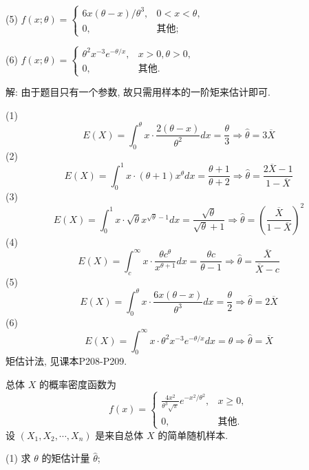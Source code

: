 \documentclass[standard]{ExBook}
\renewenvironment{shaded}{%
  \def\FrameCommand{\fboxsep=\FrameSep \colorbox{shadecolor}}%
  \MakeFramed{\advance\hsize-\width \FrameRestore}%
}{%
  \endMakeFramed
}
\begin{document}
\begin{qitems}
\begin{bbox}
\begin{shaded}
(5) \(f(x; \theta) = 
\begin{cases} 
6x(\theta - x)/\theta^3, & 0 < x < \theta, \\
0, & \text{其他};
\end{cases}\)

(6) \(f(x; \theta) = 
\begin{cases} 
\theta^2x^{-3}e^{-\theta/x}, & x > 0, \theta > 0, \\
0, & \text{其他}.
\end{cases}\)
    \end{shaded}
    \end{bbox}

\vspace{\dimexpr2.5cm-5em\relax}

解: 由于题目只有一个参数, 故只需用样本的一阶矩来估计即可.

(1)
$$
E(X) = \int_{0}^{\theta} x \cdot \frac{2(\theta - x)}{\theta^2} dx = \frac{\theta}{3}
\Longrightarrow
\hat{\theta} = 3\overline{X}
$$
(2)
$$
E(X) = \int_{0}^{1} x \cdot (\theta + 1)x^{\theta} dx = \frac{\theta + 1}{\theta + 2}
\Longrightarrow
\hat{\theta} = \frac{2\overline{X} - 1}{1 - \overline{X}}
$$
(3)
$$
E(X) = \int_{0}^{1} x \cdot \sqrt{\theta} x^{\sqrt{\theta} - 1} dx = \frac{\sqrt{\theta}}{\sqrt{\theta} + 1}
\Longrightarrow
\hat{\theta} = \left( \frac{\overline{X}}{1 - \overline{X}} \right)^2
$$
(4)
$$
E(X) = \int_{c}^{\infty} x \cdot \frac{\theta c^{\theta}}{x^{\theta + 1}} dx = \frac{\theta c}{\theta - 1}
\Longrightarrow
\hat{\theta} = \frac{\overline{X}}{\overline{X} - c}
$$
(5)
$$
E(X) = \int_{0}^{\theta} x \cdot \frac{6x(\theta - x)}{\theta^3} dx = \frac{\theta}{2}
\Longrightarrow
\hat{\theta} = 2\overline{X}
$$
(6)
$$
E(X) = \int_{0}^{\infty} x \cdot \theta^2 x^{-3} e^{-\theta/x} dx = \theta
\Longrightarrow
\hat{\theta} = \overline{X}
$$
\textcolor{themeColor}{\selectfont {} 矩估计法, 见课本P208-P209.}

\vspace{2.5cm-5em}

    \begin{bbox}
    \begin{shaded}
        \qitem
总体 \(X\) 的概率密度函数为
\[f(x) = 
\begin{cases} 
\displaystyle\frac{4x^2}{\theta^3\sqrt{\pi}}e^{-x^2/\theta^2}, & x \geq 0, \\
0, & \text{其他}.
\end{cases}\]
设 \((X_1, X_2, \cdots, X_n)\) 是来自总体 \(X\) 的简单随机样本.

(1) 求 \(\theta\) 的矩估计量 \(\hat{\theta}\);


\end{shaded}
\end{bbox}
\end{qitems}
\end{document}
